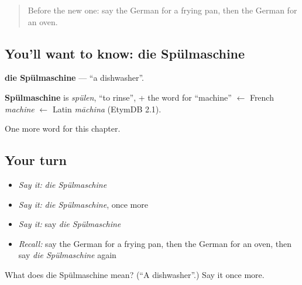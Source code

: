 \label{lesson:GE-C201-spuelmaschine}



\begin{quote}
Before the new one: say the German for a frying pan, then the German for an oven.
\end{quote}

\subsection*{You'll want to know: die Spülmaschine}
\textbf{die Spülmaschine} — \textquotedblleft{}a dishwasher\textquotedblright{}.

\begin{cousinweb}
\textbf{Spülmaschine} is \emph{spülen}, \textquotedblleft{}to rinse\textquotedblright{}, + the word for \textquotedblleft{}machine\textquotedblright{} $\leftarrow$ French \emph{machine} $\leftarrow$ Latin \emph{māchina} (EtymDB 2.1).
\end{cousinweb}

\begin{grammarlens}[title={What you've built}]
One more word for this chapter.
\end{grammarlens}

\subsection*{Your turn}
\begin{itemize}
\raggedright
  \item \emph{Say it:} \emph{die Spülmaschine}
  \item \emph{Say it:} \emph{die Spülmaschine}, once more
  \item \emph{Say it:} say \emph{die Spülmaschine}
  \item \emph{Recall:} say the German for a frying pan, then the German for an oven, then say \emph{die Spülmaschine} again
\end{itemize}

\begin{tcolorbox}[breakable,colback=teal!4,colframe=teal!35!black,title={Before you move on}]
What does die Spülmaschine mean? (\textquotedblleft{}A dishwasher\textquotedblright{}.) Say it once more.
\end{tcolorbox}
